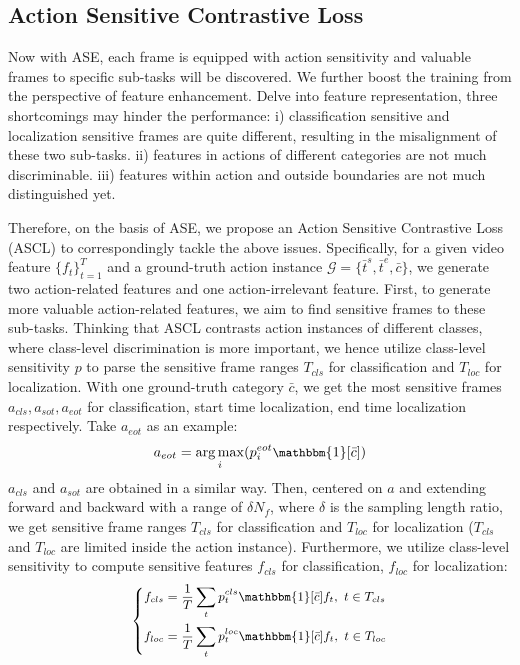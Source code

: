 \documentclass[10pt,twocolumn,letterpaper]{article}
\begin{document}
\subsection{Action Sensitive Contrastive Loss}
\label{sec:ascl} 
\par Now with ASE, each frame is equipped with action sensitivity and valuable frames to specific sub-tasks will be discovered. We further boost the training from the perspective of feature enhancement. 
Delve into feature representation, three shortcomings may hinder the performance: 
i) classification sensitive and localization sensitive frames are quite different, resulting in the misalignment of these two sub-tasks.  
ii) features in actions of different categories are not much discriminable.
iii) features within action and outside boundaries are not much distinguished yet.
\par Therefore, on the basis of ASE, we propose an Action Sensitive Contrastive Loss (ASCL) to correspondingly tackle the above issues.
Specifically, for a given video feature $\{f_t\}_{t=1}^T$ and a ground-truth action instance $\mathcal{G}\!=\!\{\bar t^s, \bar t^e, \bar c\}$, 
we generate two action-related features and one action-irrelevant feature. 
First, to generate more valuable action-related features, we aim to find sensitive frames to these sub-tasks. Thinking that ASCL contrasts action instances of different classes, where class-level discrimination is more important, we hence utilize class-level sensitivity $p$ to parse the sensitive frame ranges $T_{cls}$ for classification and $T_{loc}$ for localization.
With one ground-truth category $\bar c$, we get the most sensitive frames $a_{cls},a_{sot},a_{eot}$ for classification, start time localization, end time localization respectively. Take $a_{eot}$ as an example:
\begin{equation} \small
    a_{eot} = \underset{i}{\arg\max} (p_i^{eot} \mathbbm{1}[\bar c])
\end{equation}
$a_{cls}$ and $a_{sot}$ are obtained in a similar way. Then, centered on $a$ and extending forward and backward with a range of $\delta N_f$, where $\delta$ is the sampling length ratio, we get sensitive frame ranges $T_{cls}$ for classification and $T_{loc}$ for localization ($T_{cls}$ and $T_{loc}$ are limited inside the action instance).
Furthermore,  we utilize class-level sensitivity to compute sensitive features $f_{cls}$ for classification, $f_{loc}$ for localization:
\begin{equation}  \small
\left\{
\begin{aligned} 
f_{cls} &=  \frac{1}{T}\sum_{t} p^{cls}_t \mathbbm{1}[\bar c] f_t , \ t \in T_{cls} \\
f_{loc} &= \frac{1}{T} \sum_{t} p^{loc}_{t} \mathbbm{1}[\bar c]  f_{t}, \ t \in T_{loc} 
\end{aligned}
\right.
\end{equation}
\end{document}
